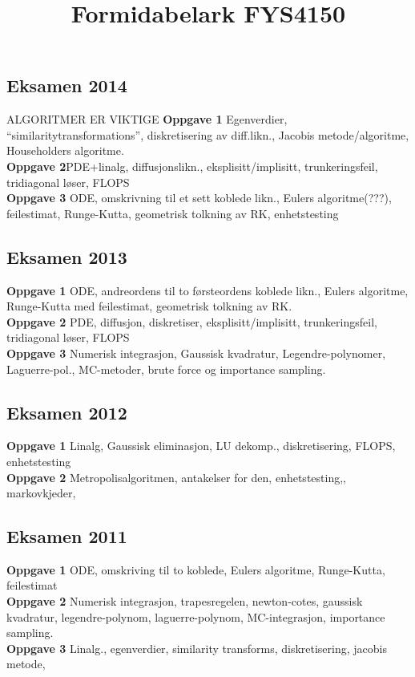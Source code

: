 \documentclass[12pt,a4paper,twocolumn]{article}
\title{Formidabelark FYS4150}
\begin{document}
\maketitle
\tableofcontents
\subsection{Eksamen 2014}
\begin{flushleft} %
\textsc{ALGORITMER ER VIKTIGE}
\textbf{Oppgave 1} Egenverdier, ``similaritytransformations'', diskretisering av diff.likn., Jacobis metode/algoritme, Householders algoritme.\\
\textbf{Oppgave 2}PDE+linalg, diffusjonslikn., eksplisitt/implisitt, trunkeringsfeil, tridiagonal løser, FLOPS\\
\textbf{Oppgave 3} ODE, omskrivning til et sett koblede likn., Eulers algoritme(???), feilestimat, Runge-Kutta, geometrisk tolkning av RK, enhetstesting

\subsection{Eksamen 2013}
\textbf{Oppgave 1} ODE, andreordens til to førsteordens koblede likn., Eulers algoritme, Runge-Kutta med feilestimat, geometrisk tolkning av RK.\\
\textbf{Oppgave 2} PDE, diffusjon, diskretiser, eksplisitt/implisitt, trunkeringsfeil, tridiagonal løser, FLOPS \\
\textbf{Oppgave 3} Numerisk integrasjon, Gaussisk kvadratur, Legendre-polynomer, Laguerre-pol., MC-metoder, brute force og importance sampling.

\subsection{Eksamen 2012}
\textbf{Oppgave 1} Linalg, Gaussisk eliminasjon, LU dekomp., diskretisering, FLOPS, enhetstesting \\
\textbf{Oppgave 2} Metropolisalgoritmen, antakelser for den, enhetstesting,, markovkjeder,

\subsection{Eksamen 2011}
\textbf{Oppgave 1} ODE, omskriving til to koblede, Eulers algoritme, Runge-Kutta, feilestimat \\
\textbf{Oppgave 2} Numerisk integrasjon, trapesregelen, newton-cotes, gaussisk kvadratur, legendre-polynom, laguerre-polynom, MC-integrasjon, importance sampling.\\
\textbf{Oppgave 3} Linalg., egenverdier, similarity transforms, diskretisering, jacobis metode, 


\end{flushleft}
\end{document}
